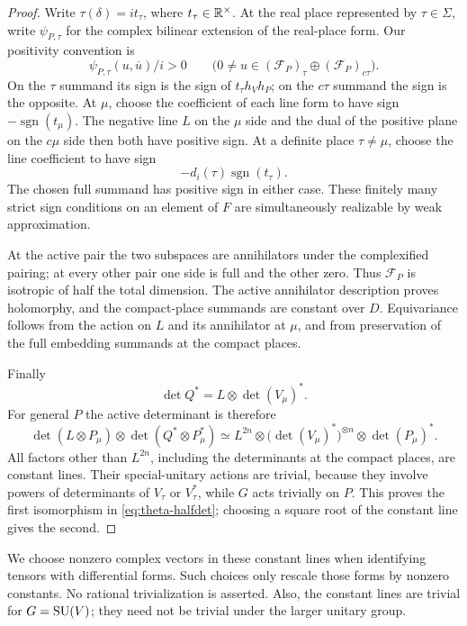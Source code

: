\begin{proof}
Write \(\tau(\delta)=it_\tau\), where \(t_\tau\in\mathbb{R}^\times\).
At the real place represented by \(\tau\in\Sigma\), write
\(\psi_{P,\tau}\) for the complex bilinear extension of the
real-place form.  Our positivity convention is
\[
 \psi_{P,\tau}(u,\overline u)/i>0
 \qquad\bigl(0\ne u\in
       (\mathcal F_P)_\tau\oplus(\mathcal F_P)_{c\tau}\bigr).
\]
On the \(\tau\) summand its sign is the sign of
\(t_\tau h_Vh_P\); on the \(c\tau\) summand the sign is the
opposite.  At \(\mu\), choose the coefficient of each line form to
have sign \(-\operatorname{sgn}(t_\mu)\).  The negative line \(L\)
on the \(\mu\) side and the dual of the positive plane on the
\(c\mu\) side then both have positive sign.  At a definite place
\(\tau\ne\mu\), choose the line coefficient to have sign
\[
 -d_i(\tau)\operatorname{sgn}(t_\tau).
\]
The chosen full summand has positive sign in either case.
These finitely many strict sign conditions on an element of \(F\)
are simultaneously realizable by weak approximation.

At the active pair the two subspaces are annihilators under the
complexified pairing; at every other pair one side is full and the
other zero.  Thus \(\mathcal F_P\) is isotropic of half the total
dimension.  The active annihilator description proves holomorphy,
and the compact-place summands are constant over \(D\).
Equivariance follows from the action on \(L\) and its annihilator
at \(\mu\), and from preservation of the full embedding summands
at the compact places.

Finally
\[
 \det Q^*=L\otimes\det(V_\mu)^*.
\]
For general \(P\) the active determinant is therefore
\[
 \det(L\otimes P_\mu)\otimes\det(Q^*\otimes P_\mu^*)
 \simeq
 L^{2n}\otimes\bigl(\det(V_\mu)^*\bigr)^{\otimes n}
       \otimes\det(P_\mu)^*.
\]
All factors other than \(L^{2n}\), including the determinants at
the compact places, are constant lines.  Their special-unitary
actions are trivial, because they involve powers of determinants
of \(V_\tau\) or \(V_\tau^*\), while \(G\) acts trivially on
\(P\).  This proves the first isomorphism in
\eqref{eq:theta-halfdet}; choosing a square root of the constant
line gives the second.
\end{proof}

We choose nonzero complex vectors in these constant lines when
identifying tensors with differential forms.  Such choices only
rescale those forms by nonzero constants.  No rational trivialization
is asserted.  Also, the constant lines are trivial for \(G=\operatorname{SU}(V)\);
they need not be trivial under the larger unitary group.

